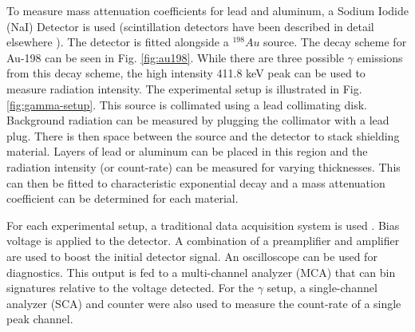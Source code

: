 To measure mass attenuation coefficients for lead and aluminum, a Sodium Iodide (NaI) Detector is used (scintillation detectors have been described in detail elsewhere \cite{krane}). The detector is fitted alongside a ${}^{198}Au$ source. The decay scheme for Au-198 can be seen in Fig. \ref{fig:au198}. While there are three possible $\gamma$ emissions from this decay scheme, the high intensity 411.8 keV peak can be used to measure radiation intensity. The experimental setup is illustrated in Fig. \ref{fig:gamma-setup}. This source is collimated using a lead collimating disk. Background radiation can be measured by plugging the collimator with a lead plug. There is then space between the source and the detector to stack shielding material. Layers of lead or aluminum can be placed in this region and the radiation intensity (or count-rate) can be measured for varying thicknesses. This can then be fitted to characteristic exponential decay and a mass attenuation coefficient can be determined for each material.

For each experimental setup, a traditional data acquisition system is used \cite{knoll}. Bias voltage is applied to the detector. A combination of a preamplifier and amplifier are used to boost the initial detector signal. An oscilloscope can be used for diagnostics. This output is fed to a multi-channel analyzer (MCA) that can bin signatures relative to the voltage detected. For the $\gamma$ setup, a single-channel analyzer (SCA) and counter were also used to measure the count-rate of a single peak channel.
